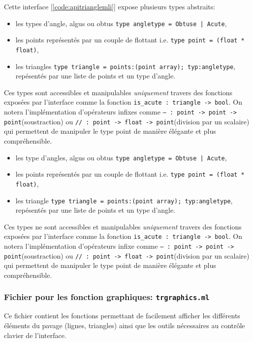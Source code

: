 \documentclass[a4paper,13pt]{article}
\begin{document}
Cette interface [\ref{code:apitrianglemli}] expose plusieurs types abstraits:
\begin{itemize}
	\item les types d'angle, aîgus ou obtus \texttt{type angletype = Obtuse | Acute},
	\item les points représentés par un couple de flottant i.e. \texttt{type point = (float * float)},
	\item les triangles \texttt{type triangle = {points:(point array); typ:angletype}}, repésentés par une liste de points et un type d'angle.
\end{itemize}
Ces types sont accessibles et manipulables \emph{uniquement} travers des fonctions exposées par l'interface comme la fonction \texttt{is_acute : triangle -> bool}. On notera l'implémentation d'opérateurs infixes comme \texttt{-- : point -> point -> point}(soustraction) ou \texttt{// : point -> float -> point}(division par un scalaire) qui permettent de manipuler le type point de manière élégante et plus compréhensible.
\begin{itemize}
	\item les type d'angles, aîgus ou obtus \texttt{type angletype = Obtuse | Acute},
	\item les points représentés par un couple de flottant i.e. \texttt{type point = (float * float)},
	\item les triangle \texttt{type triangle = {points:(point array); typ:angletype}}, repésentés par une liste de points et un type d'angle.
\end{itemize}
Ces types ne sont accessibles et manipulables \emph{uniquement} travers des fonctions exposées par l'interface comme la fonction \texttt{is_acute : triangle -> bool}. On notera l'implémentation d'opérateurs infixe comme \texttt{-- : point -> point -> point}(soustraction) ou \texttt{// : point -> float -> point}(division par un scalaire) qui permettent de manipuler le type point de manière élégante et plus compréhensible.

\subsubsection{Fichier pour les fonction graphiques: \texttt{trgraphics.ml}}
Ce fichier contient les fonctions permettant de facilement afficher les différents éléments du pavage (lignes, triangles) ainsi que les outils nécessaires au contrôle clavier de l'interface.
\end{document}
